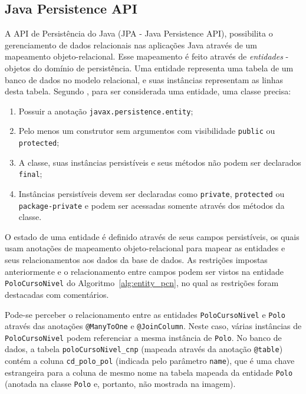 \documentclass[
  10.5pt,				  %
	openright,			%
	twoside,			  %
  a5paper,
  chapter=TITLE,	%
	section=TITLE,	%
  hyphens,        %
	english,        %
	brazil          %
]{abntex2}
\begin{document}
\subsection{Java Persistence API}

A API de Persistência do Java (JPA - Java Persistence API), possibilita o gerenciamento de dados relacionais nas aplicações Java através de um mapeamento objeto-relacional. Esse mapeamento é feito através de \emph{entidades} - objetos do domínio de persistência. Uma entidade representa uma tabela de um banco de dados no modelo relacional, e suas instâncias representam as linhas desta tabela. Segundo , para ser considerada uma entidade, uma classe precisa:

\begin{enumerate}
  \item Possuir a anotação \texttt{javax.persistence.entity};
  \item Pelo menos um construtor sem argumentos com visibilidade \texttt{public} ou \texttt{protected};
  \item A classe, suas instâncias persistíveis e seus métodos não podem ser declarados \texttt{final};
  \item Instâncias persistíveis devem ser declaradas como \texttt{private}, \texttt{protected} ou \texttt{package-private} e podem ser acessadas somente através dos métodos da classe.
\end{enumerate}

O estado de uma entidade é definido através de seus campos persistíveis, os quais usam anotações de mapeamento objeto-relacional para mapear as entidades e seus relacionamentos aos dados da base de dados. As restrições impostas anteriormente e o relacionamento entre campos podem ser vistos na entidade \texttt{PoloCursoNivel} do Algoritmo~\ref{alg:entity_pcn}, no qual as restrições foram destacadas com comentários.

Pode-se perceber o relacionamento entre as entidades \texttt{PoloCursoNivel} e \texttt{Polo} através das anotações \texttt{@ManyToOne} e \texttt{@JoinColumn}. Neste caso, várias instâncias de \texttt{PoloCursoNivel} podem referenciar a mesma instância de \texttt{Polo}. No banco de dados, a tabela \texttt{poloCursoNivel\_cnp} (mapeada através da anotação \texttt{@table}) contém a coluna \texttt{cd\_polo\_pol} (indicada pelo parâmetro \texttt{name}), que é uma chave estrangeira para a coluna de mesmo nome na tabela mapeada da entidade \texttt{Polo} (anotada na classe \texttt{Polo} e, portanto, não mostrada na imagem).
\end{document}
